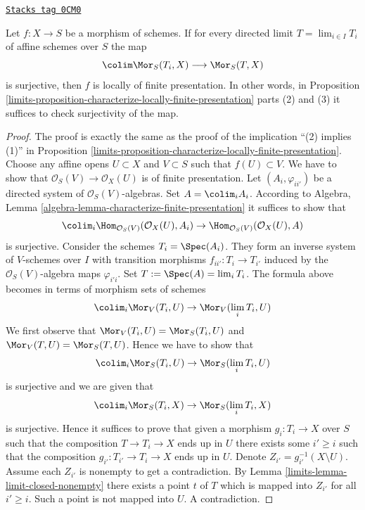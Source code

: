 \begin{lemma}
\label{limits-lemma-surjection-is-enough}
\href{https://stacks.math.columbia.edu/tag/0CM0}{\texttt{Stacks tag 0CM0}}

Let $f : X \to S$ be a morphism of schemes. If for every directed limit
$T = \lim_{i \in I} T_i$ of affine schemes over $S$ the map
$$
\colim \Mor_S(T_i, X) \longrightarrow \Mor_S(T, X)
$$
is surjective, then $f$ is locally of finite presentation.
In other words, in
Proposition \ref{limits-proposition-characterize-locally-finite-presentation}
parts (2) and (3) it suffices to check surjectivity of the map.
\end{lemma}

\begin{proof}

The proof is exactly the same as the proof of the implication
``(2) implies (1)'' in
Proposition \ref{limits-proposition-characterize-locally-finite-presentation}.
Choose any affine opens $U \subset X$ and $V \subset S$ such that
$f(U) \subset V$. We have to show that
$\mathcal{O}_S(V) \to \mathcal{O}_X(U)$ is of finite presentation.
Let $(A_i, \varphi_{ii'})$ be a directed system of
$\mathcal{O}_S(V)$-algebras. Set $A = \colim_i A_i$.
According to
Algebra, Lemma \ref{algebra-lemma-characterize-finite-presentation}
it suffices to show that
$$
\colim_i \Hom_{\mathcal{O}_S(V)}(\mathcal{O}_X(U), A_i) \to
\Hom_{\mathcal{O}_S(V)}(\mathcal{O}_X(U), A)
$$
is surjective. Consider the schemes $T_i = \Spec(A_i)$. They
form an inverse system of $V$-schemes over $I$
with transition morphisms $f_{ii'} : T_i \to T_{i'}$
induced by the $\mathcal{O}_S(V)$-algebra maps $\varphi_{i'i}$.
Set $T := \Spec(A) = \lim_i T_i$.
The formula above becomes in terms of morphism sets of schemes
$$
\colim_i \Mor_V(T_i, U) \to \Mor_V(\lim_i T_i, U)
$$
We first observe that
$\Mor_V(T_i, U) = \Mor_S(T_i, U)$
and
$\Mor_V(T, U) = \Mor_S(T, U)$.
Hence we have to show that
$$
\colim_i \Mor_S(T_i, U) \to
\Mor_S(\lim_i T_i, U)
$$
is surjective and we are given that
$$
\colim_i \Mor_S(T_i, X) \to
\Mor_S(\lim_i T_i, X)
$$
is surjective.
Hence it suffices to prove that given a morphism $g_i : T_i \to X$ over $S$
such that the composition $T \to T_i \to X$ ends up in $U$ there exists some
$i' \geq i$ such that the composition $g_{i'} : T_{i'} \to T_i \to X$ ends up
in $U$. Denote $Z_{i'} = g_{i'}^{-1}(X \setminus U)$.
Assume each $Z_{i'}$ is nonempty
to get a contradiction. By Lemma \ref{limits-lemma-limit-closed-nonempty}
there exists a point $t$ of $T$ which is mapped into $Z_{i'}$ for all
$i' \geq i$. Such a point is not mapped into $U$. A contradiction.
\end{proof}

